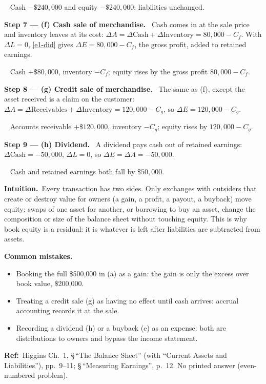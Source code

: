 \documentclass[11pt,a4paper]{article}
\newcommand{\step}[2]{\par\medskip\noindent\textbf{Step #1 --- #2.}~}
\newcommand{\intuition}{\par\medskip\noindent\textbf{Intuition.}~}
\newcommand{\refbib}{\par\smallskip\noindent\textbf{Ref:}~}
\newcommand{\answer}[1]{\par\smallskip\noindent\fbox{\textbf{Answer #1.}}~}
\newcommand{\pitfalls}{\par\medskip\noindent\textbf{Common mistakes.}}
\begin{document}
\answer{(e)} Cash $-\$240{,}000$ and equity $-\$240{,}000$; liabilities unchanged.

\step{7}{(f) Cash sale of merchandise}
Cash comes in at the sale price and inventory leaves at its cost:
$\Delta A = \Delta\text{Cash} + \Delta\text{Inventory} = 80{,}000 - C_f$. With $\Delta L = 0$,
\eqref{e1-did} gives $\Delta E = 80{,}000 - C_f$, the gross profit, added to retained earnings.

\answer{(f)} Cash $+\$80{,}000$, inventory $-C_f$; equity rises by the gross profit $80{,}000 - C_f$.

\step{8}{(g) Credit sale of merchandise}
The same as (f), except the asset received is a claim on the customer:
$\Delta A = \Delta\text{Receivables} + \Delta\text{Inventory} = 120{,}000 - C_g$, so
$\Delta E = 120{,}000 - C_g$.

\answer{(g)} Accounts receivable $+\$120{,}000$, inventory $-C_g$; equity rises by $120{,}000 - C_g$.

\step{9}{(h) Dividend}
A dividend pays cash out of retained earnings: $\Delta\text{Cash} = -50{,}000$, $\Delta L = 0$, so
$\Delta E = \Delta A = -50{,}000$.

\answer{(h)} Cash and retained earnings both fall by $\$50{,}000$.

\intuition Every transaction has two sides. Only exchanges with outsiders that create or destroy
value for owners (a gain, a profit, a payout, a buyback) move equity; swaps of one asset for
another, or borrowing to buy an asset, change the composition or size of the balance sheet
without touching equity. This is why book equity is a residual: it is whatever is left after
liabilities are subtracted from assets.

\pitfalls
\begin{itemize}
  \item Booking the full \$500{,}000 in (a) as a gain: the gain is only the excess over book value, \$200{,}000.
  \item Treating a credit sale (g) as having no effect until cash arrives: accrual accounting records it at the sale.
  \item Recording a dividend (h) or a buyback (e) as an expense: both are distributions to owners and bypass the income statement.
\end{itemize}

\refbib Higgins Ch.~1, \S\,``The Balance Sheet'' (with ``Current Assets and Liabilities''),
pp.~9--11; \S\,``Measuring Earnings'', p.~12. No printed answer (even-numbered problem).
\end{document}
